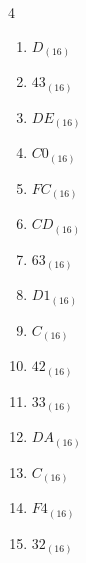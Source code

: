\begin{multicols}{4}
\begin{enumerate}
        \phantom{$=28$}

  \item $D_{(16)}$

        \phantom{$=13$}

  \item $43_{(16)}$

        \phantom{$=67$}

  \item $DE_{(16)}$

        \phantom{$=222$}

  \item $C0_{(16)}$

        \phantom{$=192$}

\columnbreak %

  \item $FC_{(16)}$

        \phantom{$=252$}

  \item $CD_{(16)}$

        \phantom{$=205$}

  \item $63_{(16)}$

        \phantom{$=99$}

  \item $D1_{(16)}$

        \phantom{$=209$}

  \item $C_{(16)}$

        \phantom{$=12$}

  \item $42_{(16)}$

        \phantom{$=66$}

  \item $33_{(16)}$

        \phantom{$=51$}

  \item $DA_{(16)}$

        \phantom{$=218$}

  \item $C_{(16)}$

        \phantom{$=12$}

  \item $F4_{(16)}$

        \phantom{$=244$}

  \item $32_{(16)}$

        \phantom{$=50$}


\end{enumerate}
\end{multicols}
